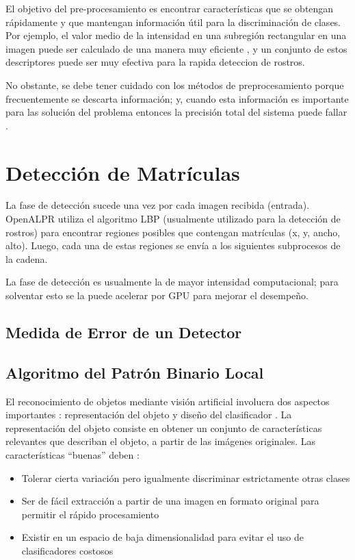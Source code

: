 El objetivo del pre-procesamiento es encontrar características que se obtengan rápidamente y que mantengan información útil para la discriminación de clases. Por ejemplo, el valor medio de la intensidad en una subregión rectangular en una imagen puede ser calculado de una manera muy eficiente \cite{Viola2004-bx}, y un conjunto de estos descriptores puede ser muy efectiva para la rapida deteccion de rostros.

No obstante, se debe tener cuidado con los métodos de preprocesamiento porque frecuentemente se descarta información; y, cuando esta información es importante para las solución del problema entonces la precisión total del sistema puede fallar \cite{Bishop2007-am}.

\section{Detección de Matrículas}
La fase de detección sucede una vez por cada imagen recibida (entrada). OpenALPR utiliza el algoritmo LBP (usualmente utilizado para la detección de rostros) para encontrar regiones posibles que contengan matrículas (x, y, ancho, alto). Luego, cada una de estas regiones se envía a los siguientes subprocesos de la cadena.

La fase de detección es usualmente la de mayor intensidad computacional; para solventar esto se la puede acelerar por GPU para mejorar el desempeño. 

\subsection{Medida de Error de un Detector}

\subsection{Algoritmo del Patrón Binario Local}
El reconocimiento de objetos mediante visión artificial involucra dos aspectos importantes \cite{Huang2011-ud}: representación del objeto \cite{Ahonen2006-gg} y diseño del clasificador \cite{Cover1967-vb,Wright2009-en,Cortes1995-qx}. La representación del objeto consiste en obtener un conjunto de características relevantes que describan el objeto, a partir de las imágenes originales. Las características “buenas” deben \cite{Hadid2004-dk}:

\begin{itemize}
\item Tolerar cierta variación pero igualmente discriminar estrictamente otras clases
\item Ser de fácil extracción a partir de una imagen en formato original para permitir el rápido procesamiento
\item Existir en un espacio de baja dimensionalidad para evitar el uso de clasificadores costosos
\end{itemize}

